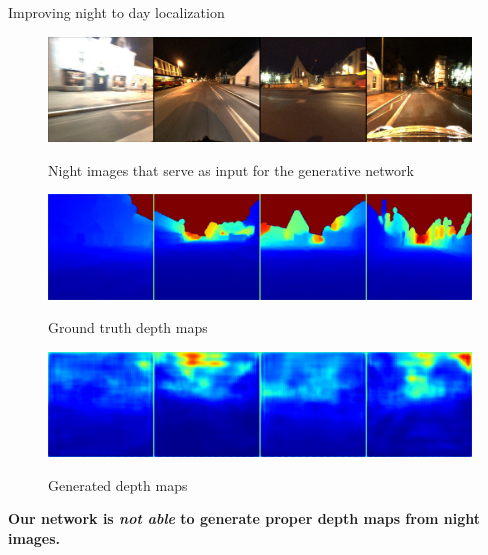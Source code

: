 \begin{frame}{Improving night to day localization}
	\begin{minipage}{0.80\linewidth}
	\begin{figure}
		\centering
		\begin{minipage}{0.74\linewidth}
			\includegraphics[width=\linewidth]{im/res/night_input}
		\end{minipage}
		\begin{minipage}{0.25\linewidth}
			\raggedright \footnotesize
			{Night images that serve as input for the generative network}
		\end{minipage}
	\end{figure}
	\vspace{-0.5cm}
	\begin{figure}
		\centering
		\begin{minipage}{0.74\linewidth}
			\includegraphics[width=\linewidth]{im/res/night_gt}
		\end{minipage}
		\begin{minipage}{0.25\linewidth}
			\raggedright \footnotesize
			{Ground truth depth maps}
		\end{minipage}
	\end{figure}	
	\vspace{-0.5cm}
	\begin{figure}
		\centering
		\begin{minipage}{0.74\linewidth}
			\includegraphics[width=\linewidth]{im/res/night_noft}
		\end{minipage}
		\begin{minipage}{0.25\linewidth}
			\raggedright \footnotesize
			{Generated depth maps}
		\end{minipage}
	\end{figure}
	\end{minipage}
	\vfill

	\textbf{Our network is \textit{not able} to generate proper depth maps from night images.}
\end{frame}

